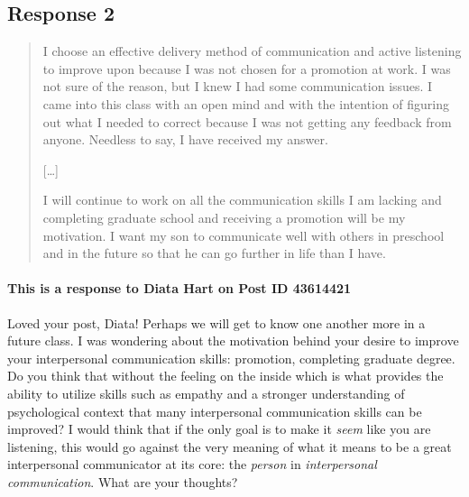 
\subsection{Response 2}
  \begin{quotation}
    I choose an effective delivery method of communication and active listening
      to improve upon because I was not chosen for a promotion at work. I was
      not sure of the reason, but I knew I had some communication issues. I came
      into this class with an open mind and with the intention of figuring out
      what I needed to correct because I was not getting any feedback from
      anyone. Needless to say, I have received my answer.

    [\ldots]

    I will continue to work on all the communication skills I am lacking and
      completing graduate school and receiving a promotion will be my
      motivation. I want my son to communicate well with others in preschool
      and in the future so that he can go further in life than I have.
  \end{quotation}

  \paragraph{This is a response to Diata Hart on Post ID 43614421}
    Loved your post, Diata! Perhaps we will get to know one another more in a
      future class. I was wondering about the motivation behind your desire
      to improve your interpersonal communication skills: promotion, completing
      graduate degree. Do you think that without the feeling on the inside which
      is what provides the ability to utilize skills such as empathy and a
      stronger understanding of psychological context that many interpersonal
      communication skills can be improved? I would think that if the only goal
      is to make it \textit{seem} like you are listening, this would go against
      the very meaning of what it means to be a great interpersonal communicator
      at its core: the \textit{person} in \textit{interpersonal communication}.
      What are your thoughts?
